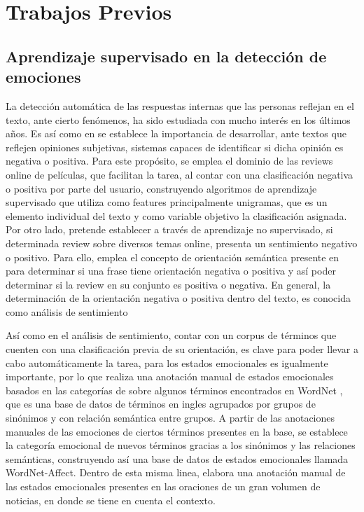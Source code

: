 \chapter{Trabajos Previos}



\section{Aprendizaje supervisado en la detección de emociones}



La detección automática de las respuestas internas que las personas reflejan en el texto, ante cierto fenómenos, ha sido estudiada con mucho interés en los últimos años. Es así como en \cite{pang2002thumbs} se  establece la importancia de desarrollar, ante textos que reflejen opiniones subjetivas, sistemas capaces de identificar si dicha opinión es negativa o positiva. Para este propósito, se emplea el dominio de las reviews online de películas, que facilitan la tarea, al contar con una clasificación negativa o positiva por parte del usuario, construyendo algoritmos de aprendizaje supervisado que utiliza como features principalmente unigramas, que es un elemento individual del texto y como variable objetivo la clasificación asignada. Por otro lado,  \cite{turney2002thumbs} pretende establecer a través de aprendizaje no supervisado, si determinada review sobre diversos temas online, presenta un sentimiento negativo o positivo. Para ello, emplea el concepto de orientación semántica presente en \cite{hatzivassiloglou1997predicting} para determinar si una frase tiene orientación negativa o positiva y así poder determinar si la review en su conjunto es positiva o negativa. En general, la determinación de la orientación negativa o positiva dentro del texto, es conocida como análisis de sentimiento

Así como en el análisis de sentimiento, contar con un corpus de términos que cuenten con una clasificación previa de su orientación, es clave para poder llevar a cabo automáticamente la tarea, para los estados emocionales  es igualmente importante, por lo que \cite{strapparava2004wordnet} realiza una anotación manual de estados emocionales basados en las categorías de \cite{ortony1987referential} sobre algunos términos encontrados en WordNet \cite{miller1995wordnet}, que es una base de datos de términos en ingles agrupados por grupos de sinónimos y con relación semántica entre grupos. A partir de las anotaciones manuales de las emociones de ciertos términos presentes en la base, se establece la categoría emocional de nuevos términos gracias a los sinónimos y las relaciones semánticas, construyendo así una base de datos de estados emocionales llamada WordNet-Affect. Dentro de esta misma linea, \cite{wiebe2005annotating}  elabora una anotación manual de las estados emocionales presentes en las oraciones de un gran volumen de noticias, en donde se tiene en cuenta el contexto. 

